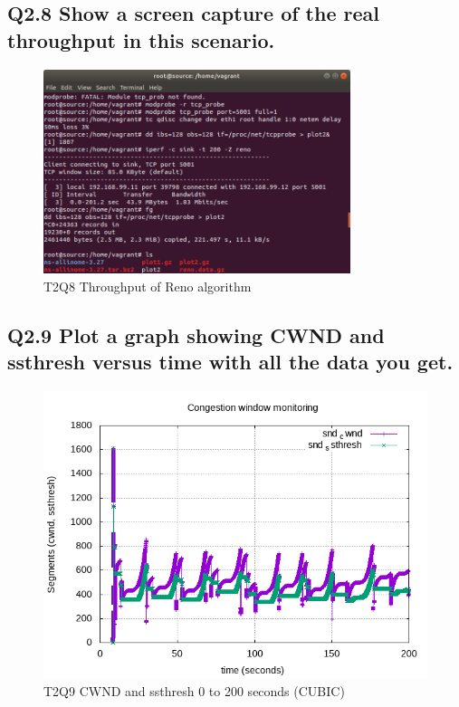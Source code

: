 \documentclass{article}
\begin{document}
\subsection{Q2.8 Show a screen capture of the real throughput in this scenario.}

\begin{figure}[H]
	\includegraphics[width=0.8\textwidth]{lab1-group1-task2-question8.png}
	\caption{T2Q8 Throughput of Reno algorithm}
\end{figure}


\subsection{Q2.9 Plot a graph showing CWND and ssthresh versus time with all the data you get.}

\begin{figure}[H]
	\includegraphics{lab1-group1-task2-question9.png}
	\caption{T2Q9 CWND and ssthresh 0 to 200 seconds (CUBIC)}
\end{figure}
\end{document}
